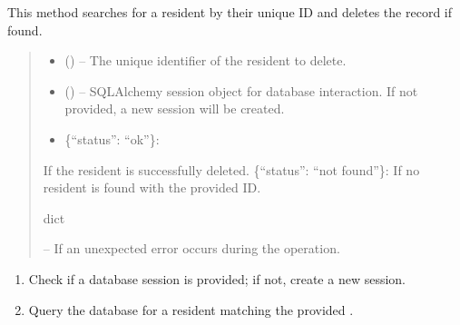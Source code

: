 \documentclass[letterpaper,10pt,english]{sphinxmanual}
\begin{document}
\begin{fulllineitems}
\begin{fulllineitems}
\sphinxAtStartPar
This method searches for a resident by their unique ID and deletes the record if found.
\begin{quote}\begin{description}
\begin{itemize}
\item {} 
\sphinxAtStartPar
{} () – The unique identifier of the resident to delete.

\item {} 
\sphinxAtStartPar
{} (\sphinxstyleliteralemphasis{\sphinxupquote{, }}) – SQLAlchemy session object for database interaction.
If not provided, a new session will be created.

\end{itemize}

\sphinxAtStartPar
\begin{description}
\begin{itemize}
\item {} 
\sphinxAtStartPar
\{“status”: “ok”\}:

\end{itemize}

\sphinxAtStartPar
If the resident is successfully deleted.
\sphinxhyphen{} \{“status”: “not found”\}:
If no resident is found with the provided ID.

\end{description}


\sphinxAtStartPar
dict

\sphinxAtStartPar
{} – If an unexpected error occurs during the operation.

\end{description}\end{quote}
\begin{description}
\begin{enumerate}
%
\item {} 
\sphinxAtStartPar
Check if a database session is provided; if not, create a new session.

\item {} 
\sphinxAtStartPar
Query the database for a resident matching the provided .


\end{enumerate}
\end{description}
\end{fulllineitems}
\end{fulllineitems}
\end{document}
